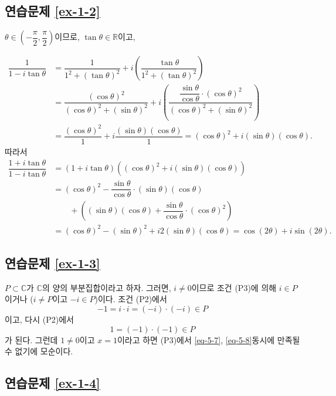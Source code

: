 \subsection*{연습문제 \ref{ex-1-2}}

$\theta \in \left(-\dfrac{\pi}2, \dfrac\pi2 \right)$이므로,
$\tan \theta \in \mathbb R$이고,

\begin{align*}
\dfrac1{1-i\tan\theta}
&= \dfrac1{1^2+(\tan\theta)^2} 
+ i\left( \dfrac{\tan\theta}{1^2 + (\tan\theta)^2} \right) \\
&= \dfrac{(\cos\theta)^2}{(\cos\theta)^2 + (\sin\theta)^2}
+ i\left( \dfrac{\dfrac{\sin\theta}{\cos\theta}\cdot(\cos\theta)^2}
{(\cos\theta)^2 + (\sin\theta)^2} \right) \\
&= \dfrac{(\cos\theta)^2}1 + i \dfrac{(\sin\theta)(\cos\theta)}1
= (\cos\theta)^2 + i(\sin\theta)(\cos\theta).
\end{align*}
따라서
\begin{align*}
\dfrac{1+i\tan\theta}{1-i\tan\theta}
&= (1+i\tan\theta)( (\cos\theta)^2 + i(\sin\theta)(\cos\theta) ) \\
&= (\cos\theta)^2 - \dfrac{\sin\theta}{\cos\theta} \cdot
(\sin\theta)(\cos\theta) \\
&\quad\quad + \left(
(\sin\theta)(\cos\theta) + \dfrac{\sin\theta}{\cos\theta} \cdot (\cos\theta)^2
\right) \\
&= (\cos\theta)^2 - (\sin\theta)^2 + i2(\sin\theta)(\cos\theta)
= \cos(2\theta) + i\sin(2\theta).
\end{align*}

\subsection*{연습문제 \ref{ex-1-3}}

$P\subset \mathbb C$가 $\mathbb C$의 양의 부분집합이라고 하자.
그러면, $i\ne0$이므로 조건 (P3)에 의해
$i\in P$이거나 ($i\ne P$이고 $-i\in P$)이다.
조건 (P2)에서
\begin{equation}\label{eq-5-7}
-1 = i\cdot i = (-i)\cdot (-i) \in P
\end{equation}
이고, 다시 (P2)에서
\begin{equation}\label{eq-5-8}
1 = (-1)\cdot(-1) \in P
\end{equation}
가 된다. 
그런데 $1\ne0$이고
$x=1$이라고 하면 (P3)에서
\eqref{eq-5-7}, \eqref{eq-5-8}\은 동시에 만족될 수 없기에 모순이다.

\subsection*{연습문제 \ref{ex-1-4}}

